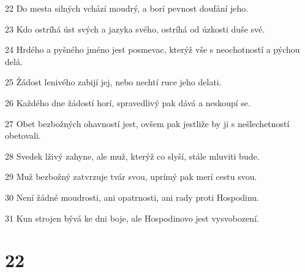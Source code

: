 \par 22 Do mesta silných vchází moudrý, a borí pevnost doufání jeho.
\par 23 Kdo ostríhá úst svých a jazyka svého, ostríhá od úzkosti duše své.
\par 24 Hrdého a pyšného jméno jest posmevac, kterýž vše s neochotností a pýchou delá.
\par 25 Žádost lenivého zabijí jej, nebo nechtí ruce jeho delati.
\par 26 Každého dne žádostí horí, spravedlivý pak dává a neskoupí se.
\par 27 Obet bezbožných ohavností jest, ovšem pak jestliže by ji s nešlechetností obetovali.
\par 28 Svedek lživý zahyne, ale muž, kterýž co slyší, stále mluviti bude.
\par 29 Muž bezbožný zatvrzuje tvár svou, uprímý pak merí cestu svou.
\par 30 Není žádné moudrosti, ani opatrnosti, ani rady proti Hospodinu.
\par 31 Kun strojen bývá ke dni boje, ale Hospodinovo jest vysvobození.

\chapter{22}

